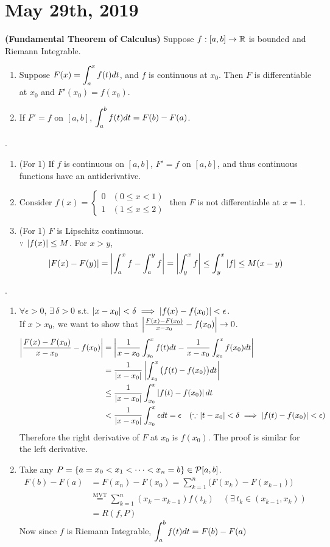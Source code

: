 \section*{May 29th, 2019}
 \textbf{(Fundamental Theorem of Calculus)} Suppose $f:[a, b]\rightarrow\mathbb{R}$ is bounded and Riemann Integrable.
\begin{enumerate}
	\item Suppose $F(x) = \displaystyle \int_a^x f(t)dt$, and $f$ is continuous at $x_0$. Then $F$ is differentiable at $x_0$ and $F'(x_0) = f(x_0)$.
	\item If $F' = f$ on $[a, b]$, $\displaystyle \int_a^b f(t) dt = F(b)-F(a)$.
\end{enumerate}
\rmk.
\begin{enumerate}
	\item (For 1) If $f$ is continuous on $[a, b]$, $F' = f$ on $[a, b]$, and thus continuous functions have an antiderivative.
	\item Consider $f(x) = \begin{cases}
		0 & (0\leq x < 1) \\ 1 & (1 \leq x \leq 2)
	\end{cases}$ then $F$ is not differentiable at $x = 1$.
	\item (For 1) $F$ is Lipschitz continuous.\\
	$\because$ $\left|f(x)\right| \leq M$. For $x > y$, $$\left|F(x) - F(y)\right| = \left|\int_a^x f - \int_a^y f\right| = \left|\int_y^x f\right| \leq \int_y^x \left|f\right| \leq M(x-y)$$
\end{enumerate}
\pf.
\begin{enumerate}
	\item $\forall\epsilon > 0$, $\exists\,\delta > 0$ s.t. $\left|x-x_0\right| < \delta \implies \left|f(x) - f(x_0)\right| < \epsilon$.\\
	If $x > x_0$, we want to show that $\left|\frac{F(x)-F(x_0)}{x-x_0} - f(x_0)\right|\rightarrow 0$.
	$$\begin{aligned}
		\left|\frac{F(x)-F(x_0)}{x-x_0} - f(x_0)\right| &= \left|\frac{1}{x-x_0}\int_{x_0}^x f(t)dt - \frac{1}{x-x_0} \int_{x_0}^xf(x_0)dt\right|\\
		&=\frac{1}{\left|x-x_0\right|} \left|\int_{x_0}^x \big(f(t)-f(x_0)\big) dt\right| \\ &\leq \frac{1}{\left|x-x_0\right|} \int_{x_0}^x \left|f(t)-f(x_0)\right|dt\\
		&< \frac{1}{\left|x-x_0\right|}\int_{x_0}^x \epsilon dt = \epsilon \quad (\because \left|t-x_0\right| < \delta \implies \left|f(t) - f(x_0)\right| < \epsilon)
	\end{aligned}$$
	Therefore the right derivative of $F$ at $x_0$ is $f(x_0)$. The proof is similar for the left derivative.
	\item Take any $P = \{a = x_0 < x_1 < \cdots < x_n = b\}\in \mathcal{P}[a, b]$.
	$$\begin{aligned}
		F(b)-F(a) &= F(x_n) - F(x_0) = \sum_{k=1}^{n} \big(F(x_k) - F(x_{k-1})\big) \\ &\overset{\text{MVT}}{=} \sum_{k=1}^n (x_k - x_{k-1}) f(t_k) \quad(\exists\, t_k \in (x_{k-1}, x_k)) \\
		&=R(f, P)
	\end{aligned}$$
	Now since $f$ is Riemann Integrable, $\displaystyle\int_a^b f(t)dt = F(b)-F(a)$
\end{enumerate}~\\
